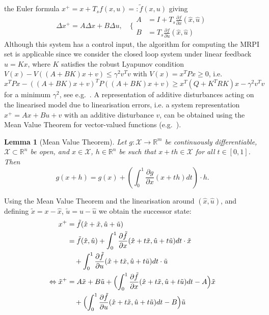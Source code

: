 \documentclass[letterpaper, 10pt, conference]{ieeeconf} %
\newtheorem{thm}{Lemma}[section]
\begin{document}
the Euler formula $x^+=x+T_s f(x,u) =:\tilde f(x,u)$ giving
\[
\Delta x^+ = A \Delta x + B \Delta u , \quad
\Biggl\{\begin{aligned} A &= I+T_s\frac{\partial f}{\partial  x}(\hat
  x,\hat u) \\
B &= T_s \frac{\partial f}{\partial u}(\hat x,\hat u)
\end{aligned}
\]
Although this system has a control input, the algorithm for computing the
MRPI set is applicable since we consider the closed loop system under
linear feedback  $u=Kx$, where $K$ satisfies the robust Lyapunov condition $V(x)-V((A+BK)x+v)\leq \gamma^2v^Tv$ 
with $V(x)=x^T P x\geq0$, i.e. $x^TPx - ((A+BK)x+v)^TP((A+BK)x+v)\geq x^T(Q+K^TRK)x -\gamma^2 v^Tv$
for a minimum  $\gamma^2$, see e.g.~\cite{Boyd:94}.
A representation of additive disturbances acting on the linearised
model due to linearisation errors, i.e. a system representation $x^+=Ax + Bu + v$ with an additive disturbance $v$, can be obtained using the
Mean Value Theorem for vector-valued functions (e.g.~\cite{Apostol:1974}).
%
%
\begin{thm}[Mean Value Theorem]\label{thm:mean:value:theorem}
Let $g : \mathcal X \rightarrow\mathbb R^m$ be continuously
differentiable, $\mathcal X\subset\mathbb R^n$ be open,
and $x \in\mathcal X$, $h \in\mathbb R^n$ be such that 
$x + th \in\mathcal X$ for all $t\in [0 ,1]$. Then
\begin{equation}
	g(x+h) = g(x) + \left(\int_0^1 \frac{\partial g}{\partial x}(x+th)dt\right)\cdot h.
\end{equation}
\end{thm}
%
%
Using the Mean Value Theorem
and the linearisation around $(\hat{x},\hat{u})$, and defining 
$\tilde{x} = x - \hat{x}$, $\tilde{u} = u - \hat{u}$ we obtain the successor state:
%
\begin{align*}
x^+ &= \tilde{f}(\hat{x} + \tilde{x},\hat{u} + \tilde{u}) 
\\
&= \tilde f(\hat x, \hat u) 
+ \int_0^1\frac{\partial\tilde f}{\partial x}(\hat x + t\tilde x,
\hat u + t\tilde u) dt \cdot \tilde x  \\
&\quad + \int_0^1\frac{\partial\tilde f}{\partial u}(\hat x + t\tilde x,\hat u+
t\tilde{u}) dt\cdot \tilde{u} \\
\Leftrightarrow 
\tilde x^+ &= A\tilde{x} + B \tilde{u} +\Bigl(
\int_0^1\frac{\partial\tilde f}{\partial x}(\hat x + t\tilde x,\hat u
             + t\tilde{u})dt - A \Bigr)\tilde x 
\\ 
&\quad +\Bigl(\int_0^1\frac{\partial\tilde f}{\partial u}(\hat x +
  t\tilde x,\hat u + t\tilde{u})dt - B\Bigr)\tilde{u}
\end{align*}
\end{document}
